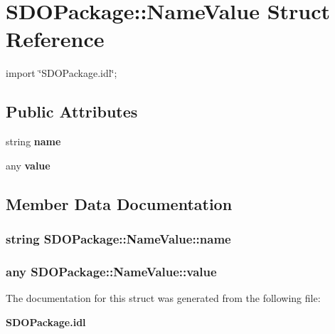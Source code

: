 \section{SDOPackage::NameValue Struct Reference}
\label{structSDOPackage_1_1NameValue}


{\ttfamily import \char`\"{}SDOPackage.idl\char`\"{};}

\subsection*{Public Attributes}
\begin{DoxyCompactItemize}
\item 
string {\bf name}
\item 
any {\bf value}
\end{DoxyCompactItemize}


\subsection{Member Data Documentation}
\subsubsection[{name}]{\setlength{\rightskip}{0pt plus 5cm}string {\bf SDOPackage::NameValue::name}}\label{structSDOPackage_1_1NameValue_a4604ff503adb6aea4fc6908be13476ad}
\subsubsection[{value}]{\setlength{\rightskip}{0pt plus 5cm}any {\bf SDOPackage::NameValue::value}}\label{structSDOPackage_1_1NameValue_a0796af9c2444254bc9b5e9f63c182f00}


The documentation for this struct was generated from the following file:\begin{DoxyCompactItemize}
\item 
{\bf SDOPackage.idl}\end{DoxyCompactItemize}
